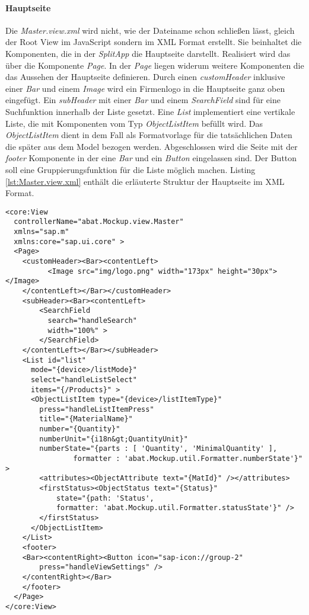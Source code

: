 \paragraph{Hauptseite}$\;$ \\
Die \textit{Master.view.xml} wird nicht, wie der Dateiname schon schließen lässt, gleich der Root View im JavaScript sondern im XML Format erstellt. Sie beinhaltet die Komponenten, die in der \textit{SplitApp} die Hauptseite darstellt. Realisiert wird das über die Komponente \textit{Page}. In der \textit{Page} liegen widerum weitere Komponenten die das Aussehen der Hauptseite definieren. Durch einen \textit{customHeader} inklusive einer \textit{Bar} und einem \textit{Image} wird ein Firmenlogo in die Hauptseite ganz oben eingefügt. Ein \textit{subHeader} mit einer \textit{Bar} und einem \textit{SearchField} sind für eine Suchfunktion innerhalb der Liste gesetzt. Eine \textit{List} implementiert eine vertikale Liste, die mit Komponenten vom Typ \textit{ObjectListItem} befüllt wird. Das \textit{ObjectListItem} dient in dem Fall als Formatvorlage für die tatsächlichen Daten die später aus dem Model bezogen werden. Abgeschlossen wird die Seite mit der \textit{footer} Komponente in der eine \textit{Bar} und ein \textit{Button} eingelassen sind. Der Button soll eine Gruppierungsfunktion für die Liste möglich machen. Listing \ref{lst:Master.view.xml} enthält die erläuterte Struktur der Hauptseite im XML Format.

	\begin{lstlisting}[frame=htrbl, caption=Hauptseite der SplitApp, label=lst:Master.view.xml]
<core:View
  controllerName="abat.Mockup.view.Master"
  xmlns="sap.m"
  xmlns:core="sap.ui.core" >
  <Page>
    <customHeader><Bar><contentLeft>
          <Image src="img/logo.png" width="173px" height="30px"></Image>
    </contentLeft></Bar></customHeader>
    <subHeader><Bar><contentLeft>
        <SearchField
          search="handleSearch"
          width="100%" >
        </SearchField>
    </contentLeft></Bar></subHeader>
    <List id="list"
      mode="{device>/listMode}"
      select="handleListSelect"
      items="{/Products}" >
      <ObjectListItem type="{device>/listItemType}"
        press="handleListItemPress"
        title="{MaterialName}"
        number="{Quantity}"
        numberUnit="{i18n&gt;QuantityUnit}"
        numberState="{parts : [ 'Quantity', 'MinimalQuantity' ],
                formatter : 'abat.Mockup.util.Formatter.numberState'}" >
        <attributes><ObjectAttribute text="{MatId}" /></attributes>
        <firstStatus><ObjectStatus text="{Status}"
            state="{path: 'Status',
            formatter: 'abat.Mockup.util.Formatter.statusState'}" />
        </firstStatus>
      </ObjectListItem>
    </List>
    <footer>
    <Bar><contentRight><Button icon="sap-icon://group-2"
        press="handleViewSettings" />
    </contentRight></Bar>
    </footer>
  </Page>
</core:View>
	\end{lstlisting}

